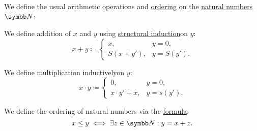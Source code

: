 \begin{definition}\label{def:natural_numbers_structure}
  We define the usual arithmetic operations and \hyperref[remark:order_infix_notation]{ordering} on the \hyperref[def:natural_numbers]{natural numbers} \( \BN \):
  \begin{DefEnum}
     We define addition of \( x \) and \( y \) using \hyperref[remark:induction]{structural induction}\IND on \( y \):
    \begin{equation*}
      x + y \coloneqq \begin{cases}
        x,         & y = 0,     \\
        S(x + y'), & y = S(y').
      \end{cases}
    \end{equation*}

     We define multiplication inductively\IND on \( y \):
    \begin{equation*}
      x \cdot y \coloneqq \begin{cases}
        0,              & y = 0,     \\
        x \cdot y' + x, & y = s(y').
      \end{cases}
    \end{equation*}

     We define the ordering of natural numbers via the \hyperref[def:first_order_formula]{formula}:
    \begin{equation*}
      x \leq y \iff \exists z \in \BN: y = x + z.
    \end{equation*}
  \end{DefEnum}
\end{definition}

